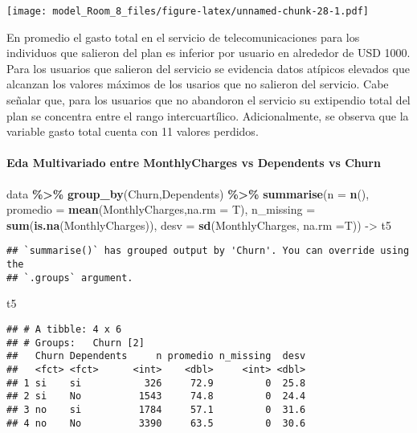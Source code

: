 \documentclass[
]{article}
\newenvironment{Shaded}{\begin{snugshade}}{\end{snugshade}}
\newcommand{\AttributeTok}[1]{\textcolor[rgb]{0.13,0.29,0.53}{#1}}
\newcommand{\FunctionTok}[1]{\textcolor[rgb]{0.13,0.29,0.53}{\textbf{#1}}}
\newcommand{\NormalTok}[1]{#1}
\newcommand{\OtherTok}[1]{\textcolor[rgb]{0.56,0.35,0.01}{#1}}
\newcommand{\SpecialCharTok}[1]{\textcolor[rgb]{0.81,0.36,0.00}{\textbf{#1}}}
\begin{document}
\texttt{[image: model\_Room\_8\_files/figure-latex/unnamed-chunk-28-1.pdf]}

En promedio el gasto total en el servicio de telecomunicaciones para los
individuos que salieron del plan es inferior por usuario en alrededor de
USD 1000. Para los usuarios que salieron del servicio se evidencia datos
atípicos elevados que alcanzan los valores máximos de los usarios que no
salieron del servicio. Cabe señalar que, para los usuarios que no
abandoron el servicio su extipendio total del plan se concentra entre el
rango intercuartílico. Adicionalmente, se observa que la variable gasto
total cuenta con 11 valores perdidos.

\hypertarget{eda-multivariado-entre-monthlycharges-vs-dependents-vs-churn}{%
\paragraph{Eda Multivariado entre MonthlyCharges vs Dependents vs
Churn}\label{eda-multivariado-entre-monthlycharges-vs-dependents-vs-churn}}

\begin{Shaded}
\begin{Highlighting}[]
\NormalTok{data }\SpecialCharTok{\%\textgreater{}\%}  \FunctionTok{group\_by}\NormalTok{(Churn,Dependents) }\SpecialCharTok{\%\textgreater{}\%} 
    \FunctionTok{summarise}\NormalTok{(}\AttributeTok{n =} \FunctionTok{n}\NormalTok{(),}
            \AttributeTok{promedio =} \FunctionTok{mean}\NormalTok{(MonthlyCharges,}\AttributeTok{na.rm =}\NormalTok{ T),}
            \AttributeTok{n\_missing =} \FunctionTok{sum}\NormalTok{(}\FunctionTok{is.na}\NormalTok{(MonthlyCharges)),}
            \AttributeTok{desv =} \FunctionTok{sd}\NormalTok{(MonthlyCharges, }\AttributeTok{na.rm =}\NormalTok{T)) }\OtherTok{{-}\textgreater{}}\NormalTok{ t5}
\end{Highlighting}
\end{Shaded}

\begin{verbatim}
## `summarise()` has grouped output by 'Churn'. You can override using the
## `.groups` argument.
\end{verbatim}

\begin{Shaded}
\begin{Highlighting}[]
\NormalTok{t5}
\end{Highlighting}
\end{Shaded}

\begin{verbatim}
## # A tibble: 4 x 6
## # Groups:   Churn [2]
##   Churn Dependents     n promedio n_missing  desv
##   <fct> <fct>      <int>    <dbl>     <int> <dbl>
## 1 si    si           326     72.9         0  25.8
## 2 si    No          1543     74.8         0  24.4
## 3 no    si          1784     57.1         0  31.6
## 4 no    No          3390     63.5         0  30.6
\end{verbatim}
\end{document}
